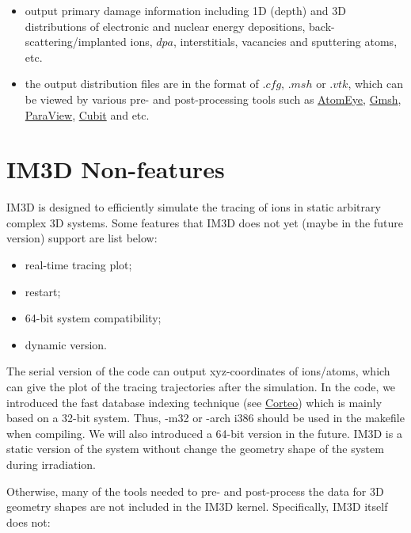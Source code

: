 \begin{itemize}
\item output primary damage information including 1D (depth) and 3D distributions of electronic and nuclear energy depositions, back-scattering/implanted ions, $dpa$, interstitials, vacancies and sputtering atoms, etc.
\item the output distribution files are in the format of $.cfg$, $.msh$ or $.vtk$, which can be viewed by various pre- and post-processing tools such as \href{http://li.mit.edu/Archive/Graphics/A/}{AtomEye}\cite{Li:2003}, \href{http://geuz.org/gmsh/}{Gmsh}\cite{Geuzaine:2009}, \href{http://www.paraview.org/}{ParaView}, \href{https://cubit.sandia.gov/}{Cubit} and etc.

\end{itemize}


\section{IM3D Non-features}

IM3D is designed to efficiently simulate the tracing of ions in static arbitrary complex 3D systems. Some features that IM3D does not yet (maybe in the future version) support are list below:

\begin{itemize}

\item real-time tracing plot;
\item restart;
\item 64-bit system compatibility;
\item dynamic version.

\end{itemize}

The serial version of the code can output xyz-coordinates of ions/atoms, which can give the plot of the tracing trajectories after the simulation. In the code, we introduced the fast database indexing technique (see \href{http://www.lps.umontreal.ca/~schiette/index.php?n=Recherche.Corteo}{Corteo}\cite{Schiettekatte:2008}) which is mainly based on a 32-bit system. Thus, -m32 or -arch i386 should be used in the makefile when compiling. We will also introduced a 64-bit version in the future. IM3D is a static version of the system without change the geometry shape of the system during irradiation.

Otherwise, many of the tools needed to pre- and post-process the data for 3D geometry shapes are not included in the IM3D kernel. Specifically, IM3D itself does not:

